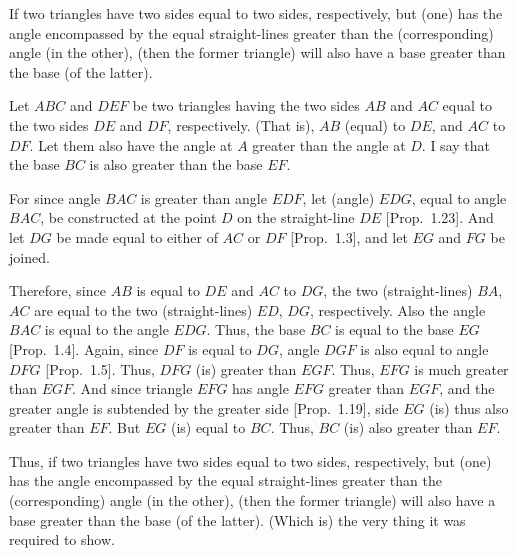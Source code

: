 \begin{Parallel}{}{}
{If two triangles have two sides equal to two sides, respectively,
but (one) has the angle encompassed by the equal straight-lines greater than the (corresponding)
angle (in the other),  (then the former triangle) will also have a base greater than the base (of the latter).

Let  $ABC$ and $DEF$ be two triangles having the two sides $AB$ and $AC$
equal to the two sides $DE$ and $DF$, respectively. (That is), $AB$ (equal) to $DE$, and
$AC$ to $DF$.  Let them also have the angle at $A$ greater than the angle at $D$.
I say that the base $BC$ is also greater than the base $EF$.

For since angle $BAC$ is greater than angle $EDF$, let (angle) $EDG$, equal to
angle $BAC$,  be constructed at  the point $D$ on the straight-line $DE$ [Prop.~1.23]. And let $DG$ be made equal to either of $AC$ or $DF$ [Prop.~1.3], and let $EG$ and $FG$ be joined.

\epsfysize=2in
\centerline{}

Therefore, since $AB$ is equal to $DE$ and $AC$ to $DG$, the two (straight-lines)
$BA$, $AC$ are equal to the two (straight-lines) $ED$, $DG$, respectively.
Also the angle $BAC$ is equal to the angle $EDG$. Thus, the base $BC$ is equal
to the base $EG$ [Prop.~1.4]. Again, since $DF$ is equal to $DG$, angle $DGF$
is also equal to angle $DFG$ [Prop.~1.5]. Thus, $DFG$ (is) greater than $EGF$.
Thus, $EFG$ is much greater than $EGF$. And since triangle $EFG$ has angle $EFG$
greater than $EGF$, and the greater angle is subtended by the greater side [Prop.~1.19], side $EG$ (is) thus also greater than $EF$. But $EG$ (is) equal to
$BC$. Thus, $BC$ (is) also greater than $EF$.

Thus, if two triangles have two sides equal to two sides, respectively,
but (one) has the angle encompassed by the equal straight-lines greater than the 
(corresponding) angle (in the other), (then the former triangle) will also have a base greater than the base (of the latter).
(Which is) the very thing it was required to show.}
\end{Parallel}

